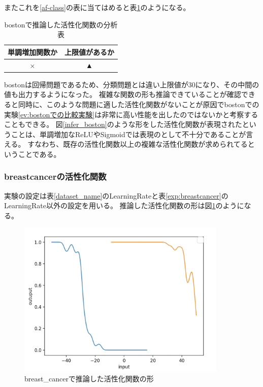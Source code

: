 またこれを\ref{af-class}の表に当てはめると表\ref{anal_boston}のようになる。
\begin{table}[htbp]
    \begin{center}
        \caption{bostonで推論した活性化関数の分析表}
        \label{anal_boston}
        \vspace{2mm} 
        \begin{tabular}{ |c|c| }
        \hline
        単調増加関数か  & 上限値があるか   \\
        \hline
        × & ▲   \\
        \hline
        \end{tabular}
    \end{center}
\end{table}


bostonは回帰問題であるため、分類問題とは違い上限値が30になり、その中間の値も出力するようになった。
複雑な関数の形も推論できていることが確認できると同時に、このような問題に適した活性化関数がないことが原因でbostonでの実験\ref{ev:bostonでの比較実験}は非常に高い性能を出したのではないかと考察することもできる。
図\ref{infer_boston}のような形をした活性化関数が表現されたということは、単調増加なReLUやSigmoidでは表現のとして不十分であることが言える。
すなわち、既存の活性化関数以上の複雑な活性化関数が求められてるということである。



\subsubsection{breastcancerの活性化関数}
実験の設定は表\ref{dataset_name}のLearningRateと表\ref{exp:breastcancer}のLearningRate以外の設定を用いる。
推論した活性化関数の形は図\ref{infer_breastcancer}のようになる。
\begin{figure}[hbtp]
    \begin{center}
        \includegraphics[width=10cm]{asset/breastcancer-0.01.png}
            \caption{breast\_cancerで推論した活性化関数の形}
            \label{infer_breastcancer}
    \end{center}
\end{figure}

